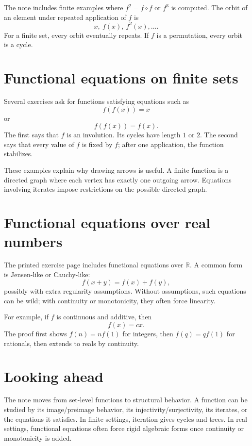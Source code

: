 The note includes finite examples where $f^2=f\circ f$ or $f^3$ is computed.  The orbit of an element under repeated application of $f$ is
\[
  x,\ f(x),\ f^2(x),\ldots.
\]
For a finite set, every orbit eventually repeats.  If $f$ is a permutation, every orbit is a cycle.

\section{Functional equations on finite sets}

Several exercises ask for functions satisfying equations such as
\[
  f(f(x))=x
\]
or
\[
  f(f(x))=f(x).
\]
The first says that $f$ is an involution.  Its cycles have length $1$ or $2$.  The second says that every value of $f$ is fixed by $f$; after one application, the function stabilizes.

These examples explain why drawing arrows is useful.  A finite function is a directed graph where each vertex has exactly one outgoing arrow.  Equations involving iterates impose restrictions on the possible directed graph.

\section{Functional equations over real numbers}

The printed exercise page includes functional equations over $\mathbb R$.  A common form is Jensen-like or Cauchy-like:
\[
  f(x+y)=f(x)+f(y),
\]
possibly with extra regularity assumptions.  Without assumptions, such equations can be wild; with continuity or monotonicity, they often force linearity.

For example, if $f$ is continuous and additive, then
\[
  f(x)=cx.
\]
The proof first shows $f(n)=nf(1)$ for integers, then $f(q)=qf(1)$ for rationals, then extends to reals by continuity.

\section{Looking ahead}

The note moves from set-level functions to structural behavior.  A function can be studied by its image/preimage behavior, its injectivity/surjectivity, its iterates, or the equations it satisfies.  In finite settings, iteration gives cycles and trees.  In real settings, functional equations often force rigid algebraic forms once continuity or monotonicity is added.

